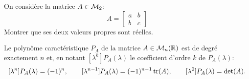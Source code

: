 \begin{exercise*}
  On considère la matrice $A \in \mathcal{M}_2$:
  $$
  A = \left[\begin{array}{cc} a & b \\ b & c\end{array}\right]
  $$
  Montrer que ses deux valeurs propres sont réelles.
\end{exercise*}


\begin{theorem} \label{thm:propPolCarac}
  Le polynôme caractéristique $P_A$ de la matrice $A \in \mathcal{M}_n(\mathbb{R})$ est de degré exactement $n$ et, en notant $[\lambda^k]P_A(\lambda)$ le coefficient d'ordre $k$ de $P_A(\lambda)$:
  $$
  [\lambda^n]P_A(\lambda) = (-1)^n, \qquad
  [\lambda^{n-1}]P_A(\lambda) = (-1)^{n-1} \operatorname{tr}(A), \qquad
  [\lambda^0]P_A(\lambda) = \det(A).
  $$
\end{theorem}

